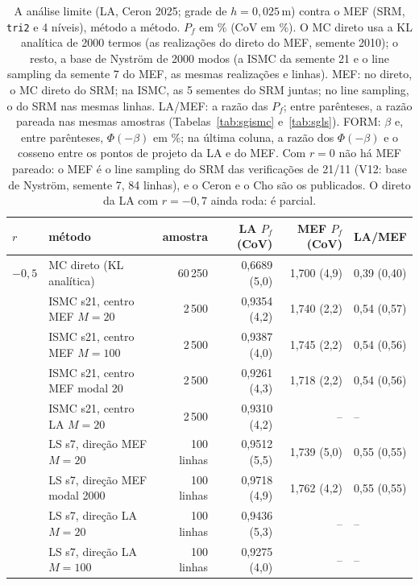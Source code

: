 \begin{table}[H]\centering\footnotesize\setlength{\tabcolsep}{3pt}
\caption{A análise limite (LA, Ceron 2025; grade de $h = 0{,}025$\,m) contra o MEF (SRM, \texttt{tri2} e 4 níveis), método a método. $P_f$ em \% (CoV em \%). O MC direto usa a KL analítica de 2000 termos (as realizações do direto do MEF, semente 2010); o resto, a base de Nyström de 2000 modos (a ISMC da semente 21 e o line sampling da semente 7 do MEF, as mesmas realizações e linhas). MEF: no direto, o MC direto do SRM; na ISMC, as 5 sementes do SRM juntas; no line sampling, o do SRM nas mesmas linhas. LA/MEF: a razão das $P_f$; entre parênteses, a razão pareada nas mesmas amostras (Tabelas~\ref{tab:sgismc} e~\ref{tab:sgls}). FORM: $\beta$ e, entre parênteses, $\Phi(-\beta)$ em \%; na última coluna, a razão dos $\Phi(-\beta)$ e o cosseno entre os pontos de projeto da LA e do MEF. Com $r = 0$ não há MEF pareado: o MEF é o line sampling do SRM das verificações de 21/11 (V12: base de Nyström, semente 7, 84 linhas), e o Ceron e o Cho são os publicados. O direto da LA com $r = -0{,}7$ ainda roda: é parcial.}\label{tab:lamef}
\begin{tabular}{llrrrl}\toprule
$r$ & método & amostra & \makecell{LA\\$P_f$ (CoV)} & \makecell{MEF\\$P_f$ (CoV)} & LA/MEF \\\midrule
$-0{,}5$ & MC direto (KL analítica) & 60\,250 & 0,6689 (5,0) & 1,700 (4,9) & 0,39 (0,40) \\
 & ISMC s21, centro MEF $M = 20$ & 2\,500 & 0,9354 (4,2) & 1,740 (2,2) & 0,54 (0,57) \\
 & ISMC s21, centro MEF $M = 100$ & 2\,500 & 0,9387 (4,0) & 1,745 (2,2) & 0,54 (0,56) \\
 & ISMC s21, centro MEF modal 20 & 2\,500 & 0,9261 (4,3) & 1,718 (2,2) & 0,54 (0,56) \\
 & ISMC s21, centro LA $M = 20$ & 2\,500 & 0,9310 (4,2) & -- & -- \\
 & LS s7, direção MEF $M = 20$ & 100 linhas & 0,9512 (5,5) & 1,739 (5,0) & 0,55 (0,55) \\
 & LS s7, direção MEF modal 2000 & 100 linhas & 0,9718 (4,9) & 1,762 (4,2) & 0,55 (0,55) \\
 & LS s7, direção LA $M = 20$ & 100 linhas & 0,9436 (5,3) & -- & -- \\
 & LS s7, direção LA $M = 100$ & 100 linhas & 0,9275 (4,0) & -- & -- \\

\end{tabular}
\end{table}
